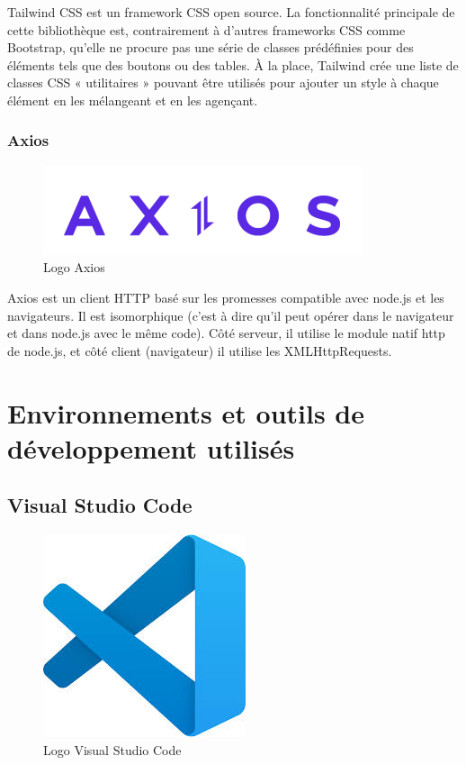 Tailwind CSS est un framework CSS open source. La fonctionnalité principale de cette bibliothèque est, contrairement à d'autres frameworks CSS comme Bootstrap, qu'elle ne procure pas une série de classes prédéfinies pour des éléments tels que des boutons ou des tables. À la place, Tailwind crée une liste de classes CSS « utilitaires » pouvant être utilisés pour ajouter un style à chaque élément en les mélangeant et en les agençant.

\subsubsection{Axios}

\begin{figure}[H]
    \centering
    \includegraphics[scale=0.5]{Logos/axios.png}
    \caption{Logo Axios}
\end{figure}

Axios est un client HTTP basé sur les promesses compatible avec node.js et les navigateurs. Il est isomorphique (c’est à dire qu’il peut opérer dans le navigateur et dans node.js avec le même code). Côté serveur, il utilise le module natif http de node.js, et côté client (navigateur) il utilise les XMLHttpRequests. \cite{axios}
\section{Environnements et outils de développement utilisés}

\subsection{Visual Studio Code }

\begin{figure}[H]
    \centering
    \includegraphics[scale=0.25]{Logos/VS.jpg}
    \caption{Logo Visual Studio Code }
\end{figure}

